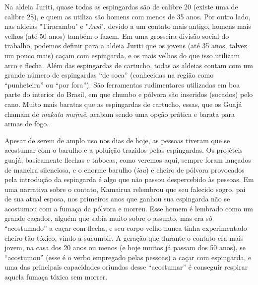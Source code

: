 Na aldeia Juriti, quase todas as espingardas são de calibre 20 (existe
uma de calibre 28), e quem as utiliza são homens com menos de 35 anos.
Por outro lado, nas aldeias "Tiracambu" e "\emph{Awá}", devido a um
contato mais antigo, homens mais velhos (até 50 anos) também o fazem. Em
uma grosseira divisão social do trabalho, podemos definir para a aldeia
Juriti que os jovens (até 35 anos, talvez um pouco mais) caçam com
espingarda, e os mais velhos do que isso utilizam arco e flecha. Além
das espingardas de cartucho, todas as aldeias contam com um grande
número de espingardas ``de soca'' (conhecidas na região como
``punheteira'' ou ``por fora''). São ferramentas rudimentares utilizadas
em boa parte do interior do Brasil, em que chumbo e pólvora são
inseridos (socados) pelo cano. Muito mais baratas que as espingardas de
cartucho, essas, que os Guajá chamam de \emph{makata majmẽ}, acabam
sendo uma opção prática e barata para armas de fogo.

Apesar de serem de amplo uso nos dias de hoje, as pessoas tiveram que se
acostumar com o barulho e a poluição trazidos pelas espingardas. Os
projéteis guajá, basicamente flechas e tabocas, como veremos aqui,
sempre foram lançados de maneira silenciosa, e o enorme barulho
(\emph{iau}) e cheiro de pólvora provocados pela introdução da
espingarda é algo que não passou despercebido às pessoas. Em uma
narrativa sobre o contato, Kamairua relembrou que seu falecido sogro,
pai de sua atual esposa, nos primeiros anos que ganhou sua espingarda
não se acostumou com a fumaça da pólvora e morreu. Esse homem é lembrado
como um grande caçador, alguém que sabia muito sobre o assunto, mas era
só ``acostumado'' a caçar com flecha, e seu corpo velho nunca tinha
experimentado cheiro tão tóxico, vindo a sucumbir. A geração que durante
o contato era mais jovem, na casa dos 20 anos ou menos (e hoje muitos já
passam dos 50 anos), se ``acostumou'' (esse é o verbo empregado pelas
pessoas) a caçar com espingarda, e uma das principais capacidades
oriundas desse ``acostumar'' é conseguir respirar aquela fumaça tóxica
sem morrer.

